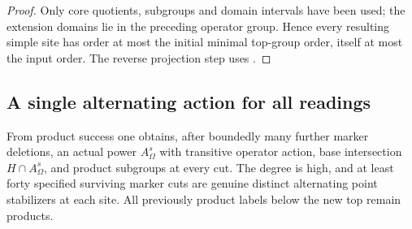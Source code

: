 \begin{proof}
Only core quotients, subgroups and domain intervals have been used;
the extension domains lie in the preceding operator group.  Hence
every resulting simple site has order at most the initial minimal
top-group order, itself at most the input order.  The reverse
projection step uses .
\end{proof}

\subsection{A single alternating action for all readings}

\begin{lemma}\label{t:weighted-restart}
From product success one obtains, after boundedly many further marker
deletions, an actual power \(A_\Omega^s\) with transitive operator action,
base intersection \(H\cap A_\Omega^s\), and product subgroups at every cut.
The degree is high, and at least forty specified surviving marker cuts are
genuine distinct alternating point stabilizers at each site.
All previously product labels below the new top remain products.
\end{lemma}
